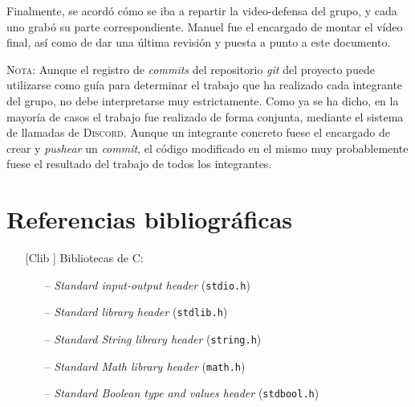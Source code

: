 \documentclass[12pt]{article}
\begin{document}
Finalmente, se acordó cómo se iba a repartir la video-defensa del grupo, y cada uno grabó su parte correspondiente. Manuel fue el encargado de montar el vídeo final, así como de dar una última revisión y puesta a punto a este documento.\par
\textsc{Nota:} Aunque el registro de \textit{commits} del repositorio \textit{git} del proyecto puede utilizarse como guía para determinar el trabajo que ha realizado cada integrante del grupo, no debe interpretarse muy estrictamente. Como ya se ha dicho, en la mayoría de casos el trabajo fue realizado de forma conjunta, mediante el sistema de llamadas de \textsc{Discord}. Aunque un integrante concreto fuese el encargado de crear y \textit{pushear} un \textit{commit}, el código modificado en el mismo muy probablemente fuese el resultado del trabajo de todos los integrantes.

\section{Referencias bibliográficas}
\vspace{-1.2cm}
\renewcommand\refname{}


\nocite{docGLF1}
\nocite{docGLF2}
\nocite{docGLF3}
\nocite{docGLF4}
\nocite{docGLF5}
\begin{itemize}
    \item[[Clib]] Bibliotecas de C:
    \begin{itemize}
        \item[--] \textit{Standard input-output header} (\texttt{stdio.h})
        \item[--] \textit{Standard library header} (\texttt{stdlib.h})
        \item[--] \textit{Standard String library header} (\texttt{string.h})
        \item[--] \textit{Standard Math library header} (\texttt{math.h})
        \item[--] \textit{Standard Boolean type and values header} (\texttt{stdbool.h})
    \end{itemize}
\end{itemize}
\end{document}
